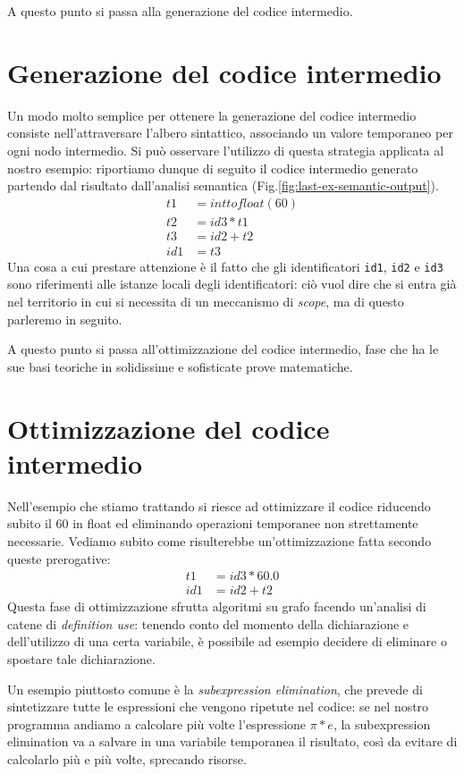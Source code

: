 \documentclass[class=book, crop=false, oneside, 12pt]{standalone}
\begin{document}
A questo punto si passa alla generazione del codice intermedio.

\section{Generazione del codice intermedio}
Un modo molto semplice per ottenere la generazione del codice intermedio consiste nell'attraversare l'albero sintattico, associando un valore temporaneo per ogni nodo intermedio.
Si può osservare l'utilizzo di questa strategia applicata al nostro esempio: riportiamo dunque di seguito il codice intermedio generato partendo dal risultato dall'analisi semantica (Fig.\ref{fig:last-ex-semantic-output}).
\begin{align*}
    t1 &= inttofloat(60) \\
    t2 &= id3 * t1 \\
    t3 &= id2 + t2 \\
    id1 &= t3
\end{align*}
Una cosa a cui prestare attenzione è il fatto che gli identificatori \texttt{id1}, \texttt{id2} e \texttt{id3} sono riferimenti alle istanze locali degli identificatori: ciò vuol dire che si entra già nel territorio in cui si necessita di un meccanismo di \emph{scope}, ma di questo parleremo in seguito.

A questo punto si passa all'ottimizzazione del codice intermedio, fase che ha le sue basi teoriche in solidissime e sofisticate prove matematiche.

\section{Ottimizzazione del codice intermedio}
Nell'esempio che stiamo trattando si riesce ad ottimizzare il codice riducendo subito il \(60\) in float ed eliminando operazioni temporanee non strettamente necessarie. Vediamo subito come risulterebbe un'ottimizzazione fatta secondo queste prerogative:
\begin{align*}
    t1 &= id3 * 60.0 \\
    id1 &= id2 + t2
\end{align*}
Questa fase di ottimizzazione sfrutta algoritmi su grafo facendo un'analisi di catene di \emph{definition use}: tenendo conto del momento della dichiarazione e dell'utilizzo di una certa variabile, è possibile ad esempio decidere di eliminare o spostare tale dichiarazione.

Un esempio piuttosto comune è la \emph{subexpression elimination}, che prevede di sintetizzare tutte le espressioni che vengono ripetute nel codice: se nel nostro programma andiamo a calcolare più volte l'espressione \(\pi * e\), la subexpression elimination va a salvare in una variabile temporanea il risultato, così da evitare di calcolarlo più e più volte, sprecando risorse.
\end{document}

